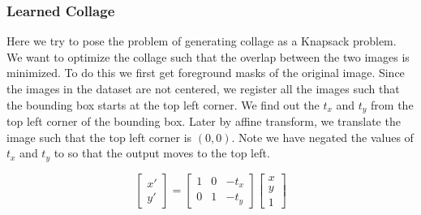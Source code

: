\documentclass{article}
\begin{document}

\subsubsection{Learned Collage}
Here we try to pose the problem of generating collage as a Knapsack problem. We want to optimize the collage such that the overlap between the two images is minimized. To do this we first get foreground masks of the original image. Since the images in the dataset are not centered, we register all the images such that the bounding box starts at the top left corner. We find out the $t_{x}$ and $t_{y}$  from the top left corner of the bounding box. Later by affine transform, we translate the image such that the top left corner is $(0,0)$. Note we have negated the values of  $t_{x}$ and $t_{y}$  to so that the output moves to the top left.

\begin{equation}
\begin{bmatrix}
x'\\
y'
\end{bmatrix}
= 
\begin{bmatrix}
1 & 0 & -t_{x}\\
0 & 1 & -t_{y}
\end{bmatrix}
\begin{bmatrix}
x\\
y\\
1
\end{bmatrix}
\end{equation}
\end{document}
